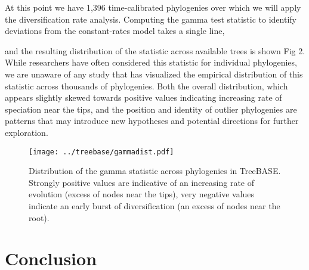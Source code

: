 \begin{Shaded}
\begin{Highlighting}[]
    \NormalTok{( }\NormalTok{(}
\NormalTok{(}
\end{Highlighting}
\end{Shaded}
At this point we have 1,396 time-calibrated phylogenies over which we
will apply the diversification rate analysis. Computing the gamma test
statistic to identify deviations from the constant-rates model takes a
single line,

\begin{Shaded}
\begin{Highlighting}[]
\end{Highlighting}
\end{Shaded}
and the resulting distribution of the statistic across available trees
is shown Fig 2. While researchers have often considered this statistic
for individual phylogenies, we are unaware of any study that has
visualized the empirical distribution of this statistic across thousands
of phylogenies. Both the overall distribution, which appears slightly
skewed towards positive values indicating increasing rate of speciation
near the tips, and the position and identity of outlier phylogenies are
patterns that may introduce new hypotheses and potential directions for
further exploration.

\begin{Shaded}
\begin{Highlighting}[]
\NormalTok{(}\NormalTok{)}
\end{Highlighting}
\end{Shaded}
\begin{figure}[htbp]
\centering
\texttt{[image: ../treebase/gammadist.pdf]}
\caption{Distribution of the gamma statistic across phylogenies in
TreeBASE. Strongly positive values are indicative of an increasing rate
of evolution (excess of nodes near the tips), very negative values
indicate an early burst of diversification (an excess of nodes near the
root).}
\end{figure}

\section{Conclusion}

